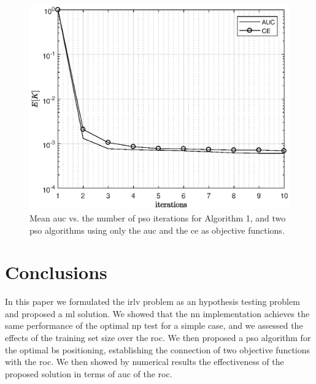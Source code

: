 \documentclass[conference,draftcls,onecolumn]{IEEEtran}
\begin{document}
 
\begin{figure} 
    \centering
    \includegraphics[width=0.9\columnwidth]{newPSO.eps}
    \caption{Mean \ac{auc} vs. the number of \ac{pso} iterations for Algorithm 1, and two \ac{pso} algorithms using only the  \ac{auc} and the \ac{ce} as objective functions. }
    \label{fig:CEvsAUC}
\end{figure}

 
\section{Conclusions}
\label{sec:conc}

In this paper we formulated the \ac{irlv} problem as an hypothesis testing problem and proposed a \ac{ml} solution. We showed that the \ac{nn} implementation achieves the same performance of the optimal \ac{np} test for a simple case, and we assessed the effects of the training set size over the \ac{roc}. We then proposed a \ac{pso}  algorithm for the  optimal \ac{bs} positioning, establishing the connection of two objective functions with the \ac{roc}. We then showed by numerical results the effectiveness of the proposed solution in terms of \ac{auc} of the \ac{roc}.


\renewcommand*{\bibfont}{\footnotesize}

\printbibliography
\end{document}
